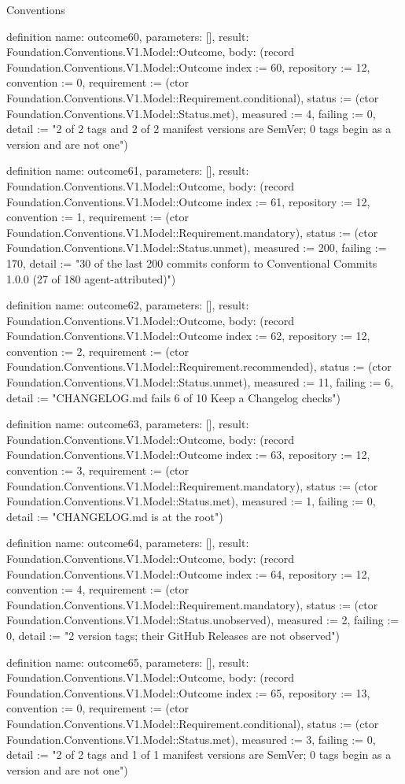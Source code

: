 \begin{lexlean}{Conventions}
\begin{semanticmodule}
definition{
  name: outcome60,
  parameters: [],
  result: Foundation.Conventions.V1.Model::Outcome,
  body: (record Foundation.Conventions.V1.Model::Outcome {index := 60, repository := 12, convention := 0, requirement := (ctor Foundation.Conventions.V1.Model::Requirement.conditional), status := (ctor Foundation.Conventions.V1.Model::Status.met), measured := 4, failing := 0, detail := "2 of 2 tags and 2 of 2 manifest versions are SemVer; 0 tags begin as a version and are not one"})
}

definition{
  name: outcome61,
  parameters: [],
  result: Foundation.Conventions.V1.Model::Outcome,
  body: (record Foundation.Conventions.V1.Model::Outcome {index := 61, repository := 12, convention := 1, requirement := (ctor Foundation.Conventions.V1.Model::Requirement.mandatory), status := (ctor Foundation.Conventions.V1.Model::Status.unmet), measured := 200, failing := 170, detail := "30 of the last 200 commits conform to Conventional Commits 1.0.0 (27 of 180 agent-attributed)"})
}

definition{
  name: outcome62,
  parameters: [],
  result: Foundation.Conventions.V1.Model::Outcome,
  body: (record Foundation.Conventions.V1.Model::Outcome {index := 62, repository := 12, convention := 2, requirement := (ctor Foundation.Conventions.V1.Model::Requirement.recommended), status := (ctor Foundation.Conventions.V1.Model::Status.unmet), measured := 11, failing := 6, detail := "CHANGELOG.md fails 6 of 10 Keep a Changelog checks"})
}

definition{
  name: outcome63,
  parameters: [],
  result: Foundation.Conventions.V1.Model::Outcome,
  body: (record Foundation.Conventions.V1.Model::Outcome {index := 63, repository := 12, convention := 3, requirement := (ctor Foundation.Conventions.V1.Model::Requirement.mandatory), status := (ctor Foundation.Conventions.V1.Model::Status.met), measured := 1, failing := 0, detail := "CHANGELOG.md is at the root"})
}

definition{
  name: outcome64,
  parameters: [],
  result: Foundation.Conventions.V1.Model::Outcome,
  body: (record Foundation.Conventions.V1.Model::Outcome {index := 64, repository := 12, convention := 4, requirement := (ctor Foundation.Conventions.V1.Model::Requirement.mandatory), status := (ctor Foundation.Conventions.V1.Model::Status.unobserved), measured := 2, failing := 0, detail := "2 version tags; their GitHub Releases are not observed"})
}

definition{
  name: outcome65,
  parameters: [],
  result: Foundation.Conventions.V1.Model::Outcome,
  body: (record Foundation.Conventions.V1.Model::Outcome {index := 65, repository := 13, convention := 0, requirement := (ctor Foundation.Conventions.V1.Model::Requirement.conditional), status := (ctor Foundation.Conventions.V1.Model::Status.met), measured := 3, failing := 0, detail := "2 of 2 tags and 1 of 1 manifest versions are SemVer; 0 tags begin as a version and are not one"})
}


\end{semanticmodule}
\end{lexlean}
